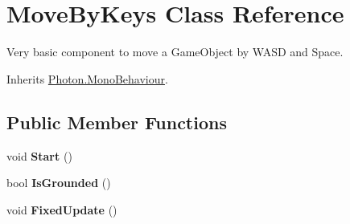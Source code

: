 \hypertarget{class_move_by_keys}{}\section{Move\+By\+Keys Class Reference}
\label{class_move_by_keys}


Very basic component to move a Game\+Object by W\+A\+SD and Space.  




Inherits \hyperlink{class_photon_1_1_mono_behaviour}{Photon.\+Mono\+Behaviour}.

\subsection*{Public Member Functions}
\begin{DoxyCompactItemize}
\item 
void {\bfseries Start} ()\hypertarget{class_move_by_keys_a12c386cc63b886a811e2801c6631f7c6}{}\label{class_move_by_keys_a12c386cc63b886a811e2801c6631f7c6}

\item 
bool {\bfseries Is\+Grounded} ()\hypertarget{class_move_by_keys_a12f570fff90c264f8ff855d82886d732}{}\label{class_move_by_keys_a12f570fff90c264f8ff855d82886d732}

\item 
void {\bfseries Fixed\+Update} ()\hypertarget{class_move_by_keys_aeeea5b489d6daab0aa8e9fc1672f5310}{}\label{class_move_by_keys_aeeea5b489d6daab0aa8e9fc1672f5310}

\end{DoxyCompactItemize}
